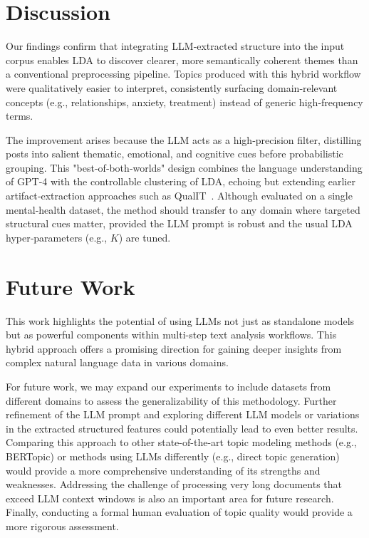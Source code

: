 \documentclass{article}
\begin{document}
\section{Discussion}


Our findings confirm that integrating LLM‑extracted structure into the input corpus enables LDA to discover clearer, more semantically coherent themes than a conventional preprocessing pipeline.  Topics produced with this hybrid workflow were qualitatively easier to interpret, consistently surfacing domain‑relevant concepts (e.g., relationships, anxiety, treatment) instead of generic high‑frequency terms.

The improvement arises because the LLM acts as a high‑precision filter, distilling posts into salient thematic, emotional, and cognitive cues before probabilistic grouping. This "best‑of‑both‑worlds" design combines the language understanding of GPT‑4 with the controllable clustering of LDA, echoing but extending earlier artifact‑extraction approaches such as QualIT~\citep{Bhaduri2024QualIT}. Although evaluated on a single mental‑health dataset, the method should transfer to any domain where targeted structural cues matter, provided the LLM prompt is robust and the usual LDA hyper‑parameters (e.g., $K$) are tuned.


\section{Future Work}

This work highlights the potential of using LLMs not just as standalone models but as powerful components within multi-step text analysis workflows. This hybrid approach offers a promising direction for gaining deeper insights from complex natural language data in various domains.

For future work, we may expand our experiments to include datasets from different domains to assess the generalizability of this methodology. Further refinement of the LLM prompt and exploring different LLM models or variations in the extracted structured features could potentially lead to even better results. Comparing this approach to other state-of-the-art topic modeling methods (e.g., BERTopic) or methods using LLMs differently (e.g., direct topic generation) would provide a more comprehensive understanding of its strengths and weaknesses. Addressing the challenge of processing very long documents that exceed LLM context windows is also an important area for future research. Finally, conducting a formal human evaluation of topic quality would provide a more rigorous assessment.
\end{document}
